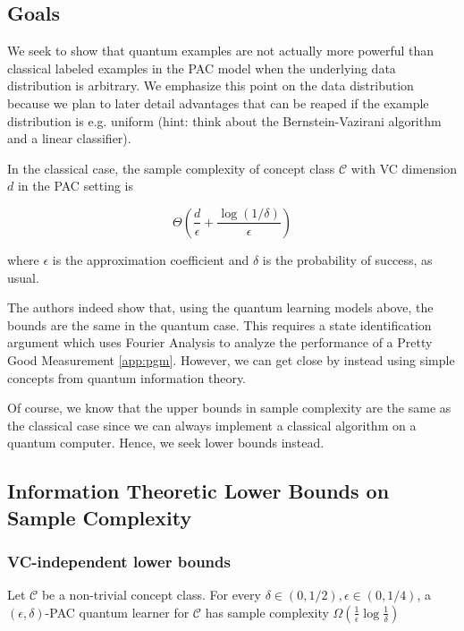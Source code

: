 \documentclass[main.tex]{subfiles}
\begin{document}
\subsection{Goals}

We seek to show that quantum examples are not actually more powerful than classical labeled examples in the PAC model when the underlying data distribution is arbitrary. We emphasize this point on the data distribution because we plan to later detail advantages that can be reaped if the example distribution is e.g. uniform (hint: think about the Bernstein-Vazirani algorithm and a linear classifier).

In the classical case, the sample complexity of concept class $\mathcal{C}$ with VC dimension $d$ in the PAC setting is

$$
\Theta(\frac{d}{\epsilon} + \frac{\log(1/\delta)}{\epsilon})
$$

where $\epsilon$ is the approximation coefficient and $\delta$ is the probability of success, as usual.
%
%

The authors indeed show that, using the quantum learning models above, the bounds are the same in the quantum case. This requires a state identification argument which uses Fourier Analysis to analyze the performance of a Pretty Good Measurement \ref{app:pgm}. However, we can get close by instead using simple concepts from quantum information theory.

Of course, we know that the upper bounds in sample complexity are the same as the classical case since we can always implement a classical algorithm on a quantum computer. Hence, we seek lower bounds instead. 

\subsection{Information Theoretic Lower Bounds on Sample Complexity}

\subsubsection{VC-independent lower bounds}

\begin{lemma}
\label{lem:vc-indep-pac}
Let $\mathcal{C}$ be a non-trivial concept class. For every $\delta \in (0,1/2), \epsilon \in (0,1/4)$, a $(\epsilon,\delta)$-PAC quantum learner for $\mathcal{C}$ has sample complexity $\Omega(\frac{1}{\epsilon}\log \frac{1}{\delta})$
\end{lemma}
\end{document}
